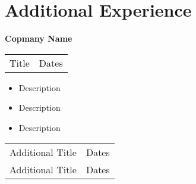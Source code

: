 \section{\sc Additional Experience}

{\bf{Copmany Name}}\\
\begin{tabular}{@{}p{4in}p{2in}}
Title & Dates\\
\end{tabular}
\begin{itemize}
\setlength\itemsep{0em}
\item Description
\item Description
\item Description
\end{itemize}
\begin{tabular}{@{}p{4in}p{2in}}
Additional Title & Dates\\
Additional Title & Dates\\
\end{tabular}
\endinput